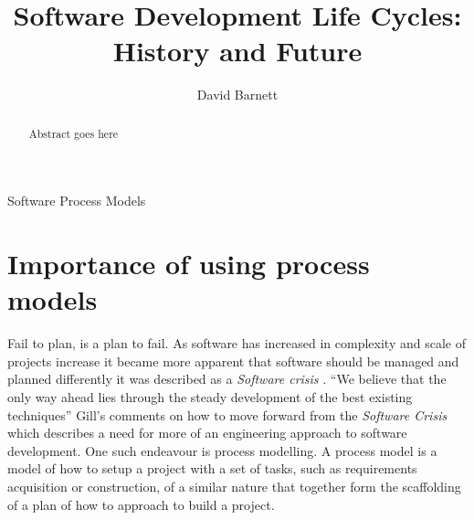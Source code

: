 \documentclass{style/CRPITStyle}
\renewcommand{\cite}{\citep}
\begin{document}
\title{Software Development Life Cycles: History and Future}
\author{David Barnett}

\maketitle

\begin{abstract}
    Abstract goes here
\end{abstract}

\vspace{.1in}

 Software Process Models

\vspace{.1in}


\section{Importance of using process models}

Fail to plan, is a plan to fail. 
As software has increased in complexity and scale of projects increase it
became more apparent that software should be managed and planned differently it was
described as a \emph{Software crisis} \cite{nato:1969}.
``We believe that the only way ahead lies through the steady development of the best existing 
techniques'' \cite{nato:1969} Gill's comments on how to move forward from the
\emph{Software Crisis} which describes a need for more of an engineering approach to software development.
One such endeavour is process modelling.
A process model is a model of how to setup a project with a set of tasks,
such as requirements acquisition or construction, of a similar nature that together form 
the scaffolding of a plan of how to approach to build a project.

\paragraph{} %
\end{document}
